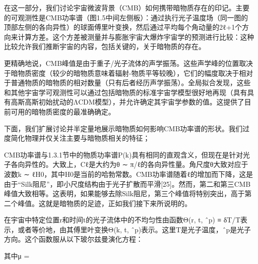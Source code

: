 


在这一部分，我们讨论宇宙微波背景（CMB）如何携带暗物质存在的印记。主要的可观测性是CMB功率谱（图1.5中间左侧板）：通过执行光子温度场（同一图的顶部左侧的各向异性）的球面傅里叶变换，然后通过平均每个角动量的2ℓ+1个方向来计算方差。这个方差被测量并与膨胀宇宙大爆炸宇宙学的预测进行比较：这种比较允许我们推断宇宙的内容，包括关键的，关于暗物质的存在。

更精确地说，CMB峰值是由于重子/光子流体的声学振荡。这些声学峰的位置取决于暗物质密度（较少的暗物质意味着辐射-物质平等较晚），它们的幅度取决于相对于普通物质的暗物质的相对数量（只有后者经历声学振荡）。全局拟合发现，这些和其他宇宙学可观测性可以通过包括暗物质的标准宇宙学模型很好地再现（具有具有高斯高斯初始扰动的ΛCDM模型），并允许确定其宇宙学参数的值。这提供了目前可用的暗物质密度的最准确确定。

下面，我们扩展讨论并半定量地展示暗物质如何影响CMB功率谱的形状。我们过度简化物理并仅关注主要与暗物质相关的特征； 

CMB功率谱与1.3.1节中的物质功率谱P(k)具有相同的直观含义，但现在是针对光子各向异性的。大致上，Cℓ是大约为θ ∼ π/ℓ的各向异性量。角尺度θ大致对应于波数k ∼ ℓH0，其中H0是当前的哈勃常数。CMB功率谱随着ℓ的增加而下降，这是由于“Silk阻尼”，即小尺度结构由于光子扩散而平滑[25]。然而，第二和第三CMB峰值大致相等。这表明，如果能够去除Silk阻尼，第三个峰值将特别突出，高于第二个峰值。这就是暗物质的足迹，正如我们接下来所说明的。

在宇宙中特定位置r和时间t的光子流体中的不均匀性由函数Θ(r, t, ˆp) ≡ δT/T表示，或者等价地，由其傅里叶变换Θ(k, t, ˆp)表示。这里T是光子温度，ˆp是光子方向。这个函数服从以下玻尔兹曼演化方程：


其中μ = 